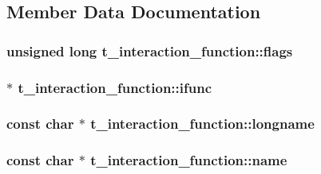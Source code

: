 \subsection{\-Member \-Data \-Documentation}
\hypertarget{structt__interaction__function_abec7b297809d3b5d37780dec2498bab1}{
\subsubsection[{flags}]{\setlength{\rightskip}{0pt plus 5cm}unsigned long {\bf t\-\_\-interaction\-\_\-function\-::flags}}}\label{structt__interaction__function_abec7b297809d3b5d37780dec2498bab1}
\hypertarget{structt__interaction__function_a78d06b78c1e074e8e1357ed3689a46a0}{
\subsubsection[{ifunc}]{ $\ast$ {\bf t\-\_\-interaction\-\_\-function\-::ifunc}}}\label{structt__interaction__function_a78d06b78c1e074e8e1357ed3689a46a0}
\hypertarget{structt__interaction__function_a1f73aa628f9f666864b5bd946c53e265}{
\subsubsection[{longname}]{\setlength{\rightskip}{0pt plus 5cm}const char $\ast$ {\bf t\-\_\-interaction\-\_\-function\-::longname}}}\label{structt__interaction__function_a1f73aa628f9f666864b5bd946c53e265}
\hypertarget{structt__interaction__function_a90a150b170c6343a7e573f1b5747c7d6}{
\subsubsection[{name}]{\setlength{\rightskip}{0pt plus 5cm}const char $\ast$ {\bf t\-\_\-interaction\-\_\-function\-::name}}}\label{structt__interaction__function_a90a150b170c6343a7e573f1b5747c7d6}
